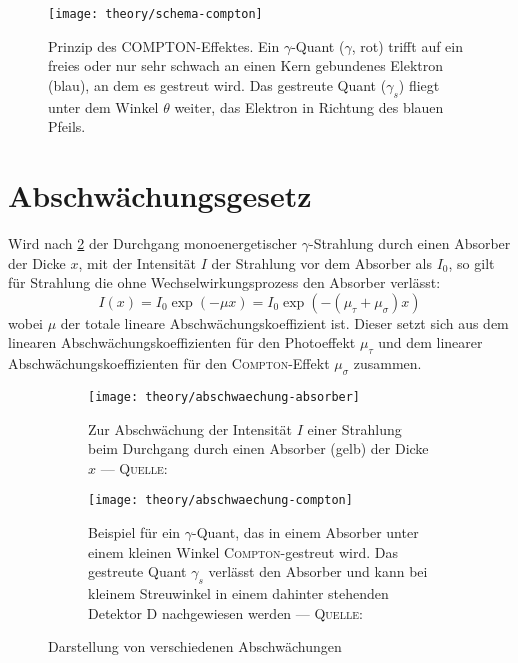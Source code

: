 \documentclass[../protokoll.tex]{subfiles}
\begin{document}
\begin{figure}[H]
    \centering
    \texttt{[image: theory/schema-compton]}
    \caption{
        Prinzip des COMPTON-Effektes. Ein $\gamma$-Quant ($\gamma$, rot) trifft auf ein freies
        oder nur sehr schwach an einen Kern gebundenes Elektron (blau), an dem 
        es gestreut wird. Das gestreute Quant ($\gamma_s$) fliegt unter dem Winkel
        $\theta$ weiter, das Elektron in Richtung des blauen Pfeils.
    }
    \label{fig:Schema Compton-Effekt}
\end{figure}

\section{Abschwächungsgesetz}
Wird nach \cref{fig:absorbtion-dicke} der Durchgang monoenergetischer 
$\gamma$-Strahlung durch einen Absorber der Dicke $x$, mit der Intensität $I$
der Strahlung vor dem Absorber als $I_0$, so gilt für Strahlung die ohne
Wechselwirkungsprozess den Absorber verlässt:
\begin{equation}
    I(x) = I_0 \exp(-\mu x) = I_0 \exp(- (\mu_\tau + \mu_\sigma) x)
\end{equation}
wobei $\mu$ der totale lineare Abschwächungskoeffizient ist. Dieser setzt sich
aus dem linearen Abschwächungskoeffizienten für den Photoeffekt $\mu_\tau$ und
dem linearer Abschwächungskoeffizienten für den \textsc{Compton}-Effekt 
$\mu_\sigma$ zusammen.

\begin{figure}[H]
    \centering
    \begin{subfigure}[t]{0.45\linewidth}
        \centering
        \texttt{[image: theory/abschwaechung-absorber]}
        \caption{
            Zur Abschwächung der Intensität $I$ einer Strahlung beim 
            Durchgang durch einen Absorber (gelb) der Dicke $x$ ---
            \textsc{Quelle}: \cite[S. 33, Abb. 5 (links)]{script}
        }
        \label{fig:absorbtion-dicke}
    \end{subfigure}
    \hfill
    \begin{subfigure}[t]{0.45\linewidth}
        \centering
        \texttt{[image: theory/abschwaechung-compton]}
        \caption{
            Beispiel für ein $\gamma$-Quant, das in einem Absorber unter einem 
            kleinen Winkel \textsc{Compton}-gestreut wird. Das gestreute Quant $\gamma_s$
            verlässt den Absorber und kann bei kleinem Streuwinkel in einem 
            dahinter stehenden Detektor D nachgewiesen werden ---
            \textsc{Quelle}: \cite[S. 33, Abb. 5 (rechts)]{script}
        }
        \label{fig:absorbtion-compton}
    \end{subfigure}
    \caption{Darstellung von verschiedenen Abschwächungen}
    \label{fig:absorbtion}
\end{figure}
\end{document}
